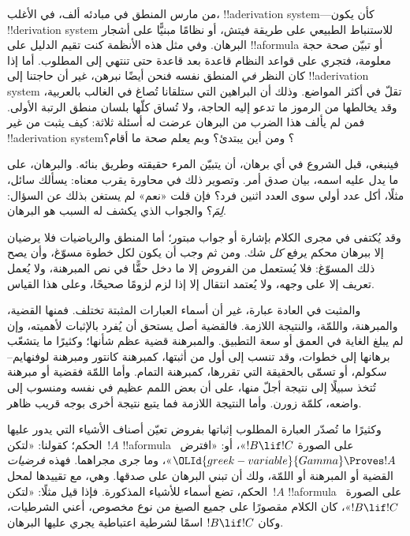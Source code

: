 \documentclass[../../../include/open-logic-section]{subfiles}
\begin{document}


من مارس المنطق في مبادئه ألف، في الأغلب، !!a{derivation}
system---كأن يكون !!{derivation} system للاستنباط الطبيعي على طريقة
فيتش، أو نظامًا مبنيًّا على أشجار البرهان. وفي مثل هذه الأنظمة كنت
تقيم الدليل على !!a{formula} أو تبيّن صحة حجة معلومة، فتجري على قواعد
النظام قاعدة بعد قاعدة حتى تنتهي إلى المطلوب. أما إذا كان النظر
\emph{في} المنطق نفسه فنحن أيضًا نبرهن، غير أن حاجتنا إلى
!!a{derivation} system تقلّ في أكثر المواضع. وذلك أن البراهين التي
ستلقانا تُصاغ في الغالب بالعربية، وقد يخالطها من الرموز ما تدعو إليه
الحاجة، ولا تُساق كلّها بلسان منطق الرتبة الأولى. فمن لم يألف هذا
الضرب من البرهان عرضت له أسئلة ثلاثة: كيف يثبت من غير
!!a{derivation} system؟ ومن أين يبتدئ؟ وبم يعلم صحة ما أقام؟

فينبغي، قبل الشروع في أي برهان، أن يتبيّن المرء حقيقته وطريق بنائه.
والبرهان، على ما يدل عليه اسمه، بيان صدق أمر. وتصوير ذلك في محاورة
يقرب معناه: يسألك سائل، مثلًا، أكل عدد أولي سوى العدد اثنين فرد؟ فإن
قلت «نعم» لم يستغن بذلك عن السؤال: \emph{لِمَ}؟ والجواب الذي يكشف له
السبب هو البرهان.

وقد يُكتفى في مجرى الكلام بإشارة أو جواب مبتور؛ أما المنطق والرياضيات
فلا يرضيان إلا ببرهان محكم يرفع \emph{كل} شك. ومن ثم وجب أن يكون لكل
خطوة مسوّغ، وأن يصح ذلك المسوّغ: فلا يُستعمل من الفروض إلا ما دخل
حقًّا في نص المبرهنة، ولا يُعمل تعريف إلا على وجهه، ولا يُعتمد انتقال
إلا إذا لزم لزومًا صحيحًا، وعلى هذا القياس.

والمثبت في العادة عبارة، غير أن أسماء العبارات المثبتة تختلف. فمنها
القضية، والمبرهنة، واللمّة، والنتيجة اللازمة. فالقضية أصل يستحق أن
يُفرد بالإثبات لأهميته، وإن لم يبلغ الغاية في العمق أو سعة التطبيق.
والمبرهنة قضية عظم شأنها؛ وكثيرًا ما يتشعّب برهانها إلى خطوات، وقد
تنسب إلى أول من أثبتها، كمبرهنة كانتور ومبرهنة لوفنهايم--سكولم، أو
تسمّى بالحقيقة التي تقررها، كمبرهنة التمام. وأما اللمّة فقضية أو
مبرهنة تُتخذ سبيلًا إلى نتيجة أجلّ منها، على أن بعض اللمم عظيم في
نفسه ومنسوب إلى واضعه، كلمّة زورن. وأما النتيجة اللازمة فما يتبع
نتيجة أخرى بوجه قريب ظاهر.

وكثيرًا ما تُصدّر العبارة المطلوب إثباتها بفروض تعيّن أصناف الأشياء
التي يدور عليها الحكم؛ كقولنا: «لتكن~$!A$ !!a{formula} على الصورة
$!B \lif !C$»، أو: «افترض~$\OLId{greek-variable}{Gamma} \Proves !A$»، وما جرى مجراهما.
فهذه \emph{فرضيات} القضية أو المبرهنة أو اللمّة، ولك أن تبني البرهان
على صدقها. وهي، مع تقييدها لمحل الحكم، تضع أسماء للأشياء المذكورة.
فإذا قيل مثلًا: «لتكن~$!A$ !!a{formula} على الصورة~$!B \lif !C$»،
كان الكلام مقصورًا على جميع الصيغ من نوع مخصوص، أعني الشرطيات، وكان
$!B \lif !C$ اسمًا لشرطية اعتباطية يجري عليها البرهان.
\end{document}
